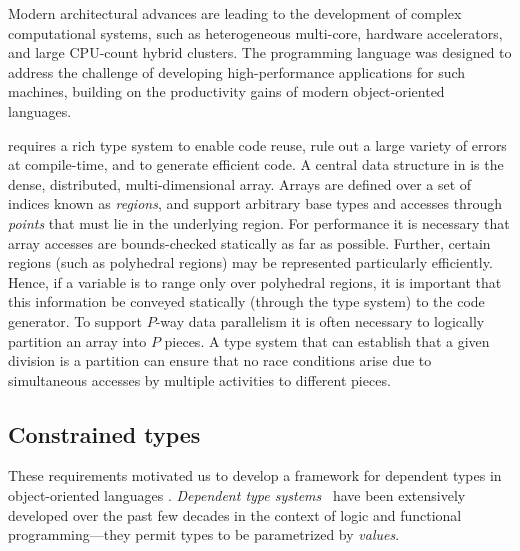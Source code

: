 

Modern architectural advances are leading to the development of
complex computational systems, such as heterogeneous multi-core,
hardware accelerators, and large CPU-count hybrid clusters.
The \Xten{} programming language \cite{X10-concur,x10-oopsla05,X10} was
designed to address the challenge of developing
high-performance applications for such machines, building on the
productivity gains of modern object-oriented languages.

\Xten{} requires a rich type system
to enable code reuse, rule out a large variety of errors at
compile-time, and to generate efficient code.
A central
data structure in \Xten{} is the dense, distributed, multi-dimensional
array.  Arrays are defined over a set of indices known as \emph{regions},
and support arbitrary base types and accesses through {\em
points} that must lie in the underlying region. For performance it is
necessary that array accesses are
bounds-checked statically as far as possible.
Further, certain regions (such as
polyhedral regions) may be represented particularly
efficiently.  Hence, if a variable is to range only over
polyhedral regions, it is important that this information be conveyed
statically (through the type system) to the code 
generator. To support $P$-way data parallelism it is often necessary
to logically partition an array into $P$ pieces. A type system that
can establish that a given division is a partition can ensure that no
race conditions arise due to simultaneous accesses by
multiple activities to different pieces.

\subsection{Constrained types}

These requirements motivated us to develop a framework for dependent
types in object-oriented languages \cite{constrained-types}.
\emph{Dependent type
systems}~\cite{dependent-types,xi99dependent,calc-constructions} have
been extensively developed over the past few decades in the context of
logic and functional programming---they permit types to be
parametrized by \emph{values}.

